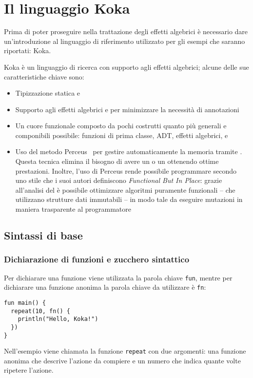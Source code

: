 \section{Il linguaggio Koka}
Prima di poter proseguire nella trattazione degli effetti algebrici è necessario dare un'introduzione al linguaggio di riferimento utilizzato per gli esempi che saranno riportati: Koka\cite{cit:koka-lang}.

Koka è un linguaggio di ricerca con supporto agli effetti algebrici; alcune delle sue caratteristiche chiave sono:
\begin{itemize}
  \item Tipizzazione statica e 
  \item Supporto agli effetti algebrici e  per minimizzare la necessità di annotazioni
  \item Un cuore funzionale composto da pochi costrutti quanto più generali e componibili possibile: funzioni di prima classe, \ac{ADT}, effetti algebrici, e 
  \item Uso del metodo Perceus~\cite{cit:perceus-garbage-free-reference-counting-with-reuse} per gestire automaticamente la memoria tramite . Questa tecnica elimina il bisogno di avere un  o un  ottenendo ottime prestazioni. Inoltre, l'uso di Perceus rende possibile programmare secondo uno stile che i suoi autori definiscono \emph{Functional But In Place}: grazie all'analisi del  è possibile ottimizzare algoritmi puramente funzionali -- che utilizzano strutture dati immutabili -- in modo tale da eseguire mutazioni  in maniera trasparente al programmatore~\cite{cit:koka-benchmarks}
\end{itemize}

\subsection{Sintassi di base}
\subsubsection{Dichiarazione di funzioni e zucchero sintattico}
Per dichiarare una funzione viene utilizzata la parola chiave \lstinline{fun}, mentre per dichiarare una funzione anonima la parola chiave da utilizzare è \lstinline{fn}:
\begin{lstlisting}[language=koka]
fun main() {
  repeat(10, fn() {
    println("Hello, Koka!")
  })
}
\end{lstlisting}
Nell'esempio viene chiamata la funzione \lstinline{repeat} con due argomenti: una funzione anonima che descrive l'azione da compiere e un numero che indica quante volte ripetere l'azione.

